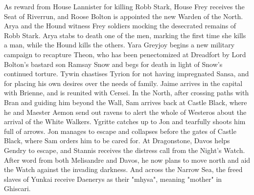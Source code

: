 As reward from House Lannister for killing Robb Stark, House Frey receives the Seat of Riverrun, and Roose Bolton is appointed the new Warden of the North.
 Arya and the Hound witness Frey soldiers mocking the desecrated remains of Robb Stark.
 Arya stabs to death one of the men, marking the first time she kills a man, while the Hound kills the others.
 Yara Greyjoy begins a new military campaign to recapture Theon, who has been penectomized at Dreadfort by Lord Bolton's bastard son Ramsay Snow and begs for death in light of Snow's continued torture.
 Tywin chastises Tyrion for not having impregnated Sansa, and for placing his own desires over the needs of family.
 Jaime arrives in the capital with Brienne, and is reunited with Cersei.
 In the North, after crossing paths with Bran and guiding him beyond the Wall, Sam arrives back at Castle Black, where he and Maester Aemon send out ravens to alert the whole of Westeros about the arrival of the White Walkers.
 Ygritte catches up to Jon and tearfully shoots him full of arrows.
 Jon manages to escape and collapses before the gates of Castle Black, where Sam orders him to be cared for.
 At Dragonstone, Davos helps Gendry to escape, and Stannis receives the distress call from the Night's Watch.
 After word from both Melisandre and Davos, he now plans to move north and aid the Watch against the invading darkness.
 And across the Narrow Sea, the freed slaves of Yunkai receive Daenerys as their "mhysa", meaning "mother" in Ghiscari.
